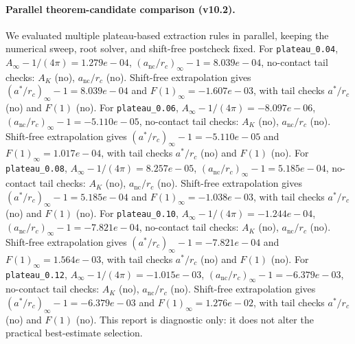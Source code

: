 \paragraph{Parallel theorem-candidate comparison (v10.2).}
We evaluated multiple plateau-based extraction rules in parallel, keeping the numerical sweep, root solver, and shift-free postcheck fixed. For \texttt{plateau_0.04}, $A_\infty-1/(4\pi)=1.279e-04$, $(a_{\mathrm{nc}}/r_c)_\infty-1=8.039e-04$, no-contact tail checks: $A_K$ (no), $a_{\mathrm{nc}}/r_c$ (no). Shift-free extrapolation gives $(a^*/r_c)_\infty-1=8.039e-04$ and $F(1)_\infty=-1.607e-03$, with tail checks $a^*/r_c$ (no) and $F(1)$ (no). For \texttt{plateau_0.06}, $A_\infty-1/(4\pi)=-8.097e-06$, $(a_{\mathrm{nc}}/r_c)_\infty-1=-5.110e-05$, no-contact tail checks: $A_K$ (no), $a_{\mathrm{nc}}/r_c$ (no). Shift-free extrapolation gives $(a^*/r_c)_\infty-1=-5.110e-05$ and $F(1)_\infty=1.017e-04$, with tail checks $a^*/r_c$ (no) and $F(1)$ (no). For \texttt{plateau_0.08}, $A_\infty-1/(4\pi)=8.257e-05$, $(a_{\mathrm{nc}}/r_c)_\infty-1=5.185e-04$, no-contact tail checks: $A_K$ (no), $a_{\mathrm{nc}}/r_c$ (no). Shift-free extrapolation gives $(a^*/r_c)_\infty-1=5.185e-04$ and $F(1)_\infty=-1.038e-03$, with tail checks $a^*/r_c$ (no) and $F(1)$ (no). For \texttt{plateau_0.10}, $A_\infty-1/(4\pi)=-1.244e-04$, $(a_{\mathrm{nc}}/r_c)_\infty-1=-7.821e-04$, no-contact tail checks: $A_K$ (no), $a_{\mathrm{nc}}/r_c$ (no). Shift-free extrapolation gives $(a^*/r_c)_\infty-1=-7.821e-04$ and $F(1)_\infty=1.564e-03$, with tail checks $a^*/r_c$ (no) and $F(1)$ (no). For \texttt{plateau_0.12}, $A_\infty-1/(4\pi)=-1.015e-03$, $(a_{\mathrm{nc}}/r_c)_\infty-1=-6.379e-03$, no-contact tail checks: $A_K$ (no), $a_{\mathrm{nc}}/r_c$ (no). Shift-free extrapolation gives $(a^*/r_c)_\infty-1=-6.379e-03$ and $F(1)_\infty=1.276e-02$, with tail checks $a^*/r_c$ (no) and $F(1)$ (no). This report is diagnostic only: it does not alter the practical best-estimate selection.
